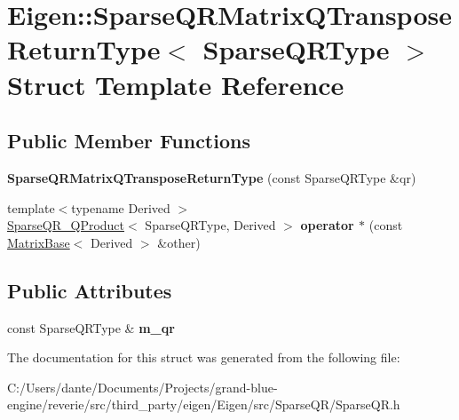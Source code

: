 \hypertarget{struct_eigen_1_1_sparse_q_r_matrix_q_transpose_return_type}{}\section{Eigen\+::Sparse\+Q\+R\+Matrix\+Q\+Transpose\+Return\+Type$<$ Sparse\+Q\+R\+Type $>$ Struct Template Reference}
\label{struct_eigen_1_1_sparse_q_r_matrix_q_transpose_return_type}
\subsection*{Public Member Functions}
\begin{DoxyCompactItemize}
\item 
\mbox{\label{struct_eigen_1_1_sparse_q_r_matrix_q_transpose_return_type_aab227f4e109f500eb2d9d2edfe926993}} 
{\bfseries Sparse\+Q\+R\+Matrix\+Q\+Transpose\+Return\+Type} (const Sparse\+Q\+R\+Type \&qr)
\item 
\mbox{\label{struct_eigen_1_1_sparse_q_r_matrix_q_transpose_return_type_aea29a518f9c31aad3ac53d82bb381fce}} 
{\footnotesize template$<$typename Derived $>$ }\\\mbox{\hyperlink{struct_eigen_1_1_sparse_q_r___q_product}{Sparse\+Q\+R\+\_\+\+Q\+Product}}$<$ Sparse\+Q\+R\+Type, Derived $>$ {\bfseries operator $\ast$} (const \mbox{\hyperlink{class_eigen_1_1_matrix_base}{Matrix\+Base}}$<$ Derived $>$ \&other)
\end{DoxyCompactItemize}
\subsection*{Public Attributes}
\begin{DoxyCompactItemize}
\item 
\mbox{\label{struct_eigen_1_1_sparse_q_r_matrix_q_transpose_return_type_a170ec3f522a185aa41a0a5301b31f7e9}} 
const Sparse\+Q\+R\+Type \& {\bfseries m\+\_\+qr}
\end{DoxyCompactItemize}


The documentation for this struct was generated from the following file\+:\begin{DoxyCompactItemize}
\item 
C\+:/\+Users/dante/\+Documents/\+Projects/grand-\/blue-\/engine/reverie/src/third\+\_\+party/eigen/\+Eigen/src/\+Sparse\+Q\+R/Sparse\+Q\+R.\+h\end{DoxyCompactItemize}
